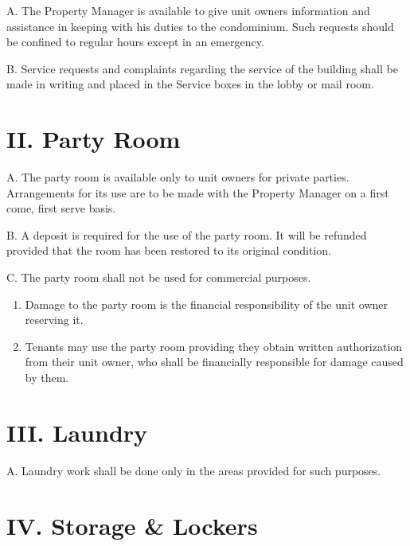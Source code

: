 \documentclass[
  14pt,
]{book}
\begin{document}
A. The Property Manager is available to give unit owners information and assistance in keeping with his duties to the condominium. Such requests should be confined to regular hours except in an emergency.

B. Service requests and complaints regarding the service of the building shall be made in writing and placed in the Service boxes in the lobby or mail room.

\hypertarget{ii.-party-room}{%
\section*{II. Party Room}\label{ii.-party-room}}

A. The party room is available only to unit owners for private parties. Arrangements for its use are to be made with the Property Manager on a first come, first serve basis.

B. A deposit is required for the use of the party room. It will be refunded provided that the room has been restored to its original condition.

C. The party room shall not be used for commercial purposes.

\begin{enumerate}
\def\labelenumi{\arabic{enumi}.}
\item
  Damage to the party room is the financial responsibility of the unit owner reserving it.
\item
  Tenants may use the party room providing they obtain written authorization from their unit owner, who shall be financially responsible for damage caused by them.
\end{enumerate}

\hypertarget{iii.-laundry}{%
\section*{III. Laundry}\label{iii.-laundry}}

A. Laundry work shall be done only in the areas provided for such purposes.

\hypertarget{iv.-storage-lockers}{%
\section*{IV. Storage \& Lockers}\label{iv.-storage-lockers}}
\end{document}
